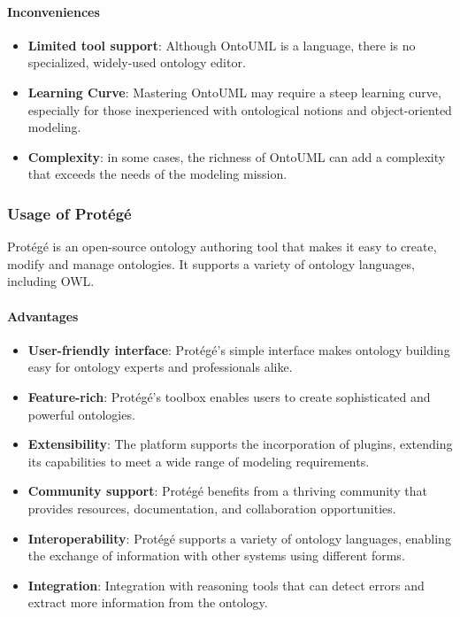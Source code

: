     \paragraph{Inconveniences}
        \begin{itemize}
            \item \textbf{Limited tool support}: Although OntoUML is a language, there is no specialized, widely-used ontology editor.
            \item \textbf{Learning Curve}: Mastering OntoUML may require a steep learning curve, especially for those inexperienced with ontological notions and object-oriented modeling.
            \item \textbf{Complexity}: in some cases, the richness of OntoUML can add a complexity that exceeds the needs of the modeling mission.
        \end{itemize}
    
    \subsubsection{Usage of Protégé}
    Protégé is an open-source ontology authoring tool that makes it easy to create, modify and manage ontologies. It supports a variety of ontology languages, including OWL.
    
    \paragraph{Advantages}
    \begin{itemize}
        \item \textbf{User-friendly interface}: Protégé's simple interface makes ontology building easy for ontology experts and professionals alike.
        \item \textbf{Feature-rich}: Protégé's toolbox enables users to create sophisticated and powerful ontologies.
        \item \textbf{Extensibility}: The platform supports the incorporation of plugins, extending its capabilities to meet a wide range of modeling requirements.
        \item \textbf{Community support}: Protégé benefits from a thriving community that provides resources, documentation, and collaboration opportunities.
        \item \textbf{Interoperability}: Protégé supports a variety of ontology languages, enabling the exchange of information with other systems using different forms.
        \item \textbf{Integration}:  Integration with reasoning tools that can detect errors and extract more information from the ontology.
    \end{itemize}
    
